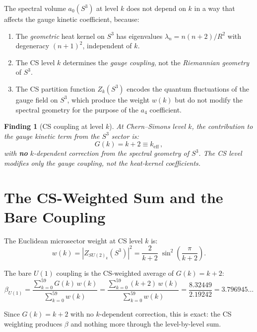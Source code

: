 \documentclass[12pt,a4paper]{article}
\newtheorem{finding}{Finding}
\theoremstyle{definition}
\theoremstyle{remark}
\begin{document}
The spectral volume $a_0(S^3)$ at level $k$ does not depend on $k$ in a
way that affects the gauge kinetic coefficient, because:
\begin{enumerate}
\item The \emph{geometric} heat kernel on $S^3$ has eigenvalues
  $\lambda_n = n(n+2)/R^2$ with degeneracy $(n+1)^2$, independent of $k$.
\item The CS level $k$ determines the \emph{gauge coupling}, not the
  \emph{Riemannian geometry} of $S^3$.
\item The CS partition function $Z_k(S^3)$ encodes the quantum fluctuations
  of the gauge field on $S^3$, which produce the weight $w(k)$ but do not
  modify the spectral geometry for the purpose of the $a_4$ coefficient.
\end{enumerate}

\begin{finding}[CS coupling at level $k$]
At Chern--Simons level $k$, the contribution to the gauge kinetic term
from the $S^3$ sector is:
\begin{equation}
G(k) = k + 2 \equiv k_{\mathrm{eff}}\,,
\end{equation}
with \textbf{no} $k$-dependent correction from the spectral geometry of
$S^3$.  The CS level modifies only the gauge coupling, not the heat-kernel
coefficients.
\end{finding}

\section{The CS-Weighted Sum and the Bare Coupling}
\label{sec:CS-sum}

The Euclidean microsector weight at CS level $k$ is:
\begin{equation}
w(k) = |Z_{SU(2)_k}(S^3)|^2
= \frac{2}{k+2}\;\sin^2\!\left(\frac{\pi}{k+2}\right).
\end{equation}

The bare $U(1)$ coupling is the CS-weighted average of $G(k) = k+2$:
\begin{equation}
\beta_{U(1)} = \frac{\sum_{k=0}^{59} G(k)\,w(k)}
{\sum_{k=0}^{59} w(k)}
= \frac{\sum_{k=0}^{59} (k+2)\,w(k)}
{\sum_{k=0}^{59} w(k)}
= \frac{8.32449}{2.19242} = 3.796945\ldots
\end{equation}

Since $G(k) = k+2$ with no $k$-dependent correction, this is exact:
the CS weighting produces $\beta$ and nothing more through the
level-by-level sum.
\end{document}
